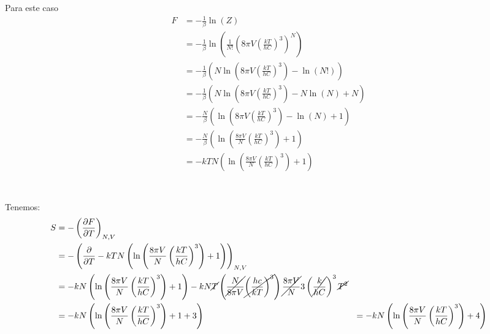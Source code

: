 \documentclass{report}
\begin{document}
Para este caso
\begin{align*}
	F &= - \frac{1}{\beta} \ln \left( Z \right)\\
	&= - \frac{1}{\beta} \ln \left( \frac{1}{N!} \left( 8\pi V \left( \frac{kT}{hC} \right)^3\right)^N\right)\\
	&= - \frac{1}{\beta} \left( N \ln \left( 8\pi V \left( \frac{kT}{hC} \right)^3\right) - \ln(N!) \right)\\
	&= - \frac{1}{\beta} \left( N \ln \left( 8\pi V \left( \frac{kT}{hC} \right)^3\right) - N\ln(N) + N \right)\\
	&= - \frac{N}{\beta} \left( \ln \left( 8\pi V \left( \frac{kT}{hC} \right)^3\right) - \ln(N) + 1 \right)\\
	&= - \frac{N}{\beta} \left( \ln \left( \frac{8\pi V}{N} \left( \frac{kT}{hC} \right)^3\right) + 1 \right)\\
	&= - kT N \left( \ln \left( \frac{8\pi V}{N} \left( \frac{kT}{hC} \right)^3\right) + 1 \right)\\
\end{align*}

\section{}

Tenemos:
\begin{align*}
	S &= - \left( \frac{\partial F}{\partial T} \right)_{N, V}\\
	&= - \left( \frac{\partial}{\partial T} - kT N \left( \ln \left( \frac{8\pi V}{N} \left( \frac{kT}{hC} \right)^3\right) + 1 \right)\right)_{N, V}\\
	&= -kN \left( \ln \left( \frac{8\pi V}{N} \left( \frac{kT}{hC} \right)^3 \right) + 1\right) - kN\cancel{T} \left( \cancel{\frac{N}{8\pi V}} \cancel{\left( \frac{hc}{kT} \right)^3} \right) \cancel{\frac{8\pi V}{N}} 3 \left( \cancel{\frac{k}{hC}} \right)^3 \cancel{T^2}\\
	&= -kN \left( \ln \left( \frac{8\pi V}{N} \left( \frac{kT}{hC} \right)^3 \right) + 1 + 3 \right)
	&= -kN \left( \ln \left( \frac{8\pi V}{N} \left( \frac{kT}{hC} \right)^3 \right) + 4 \right)
\end{align*}

\section{}
\end{document}
